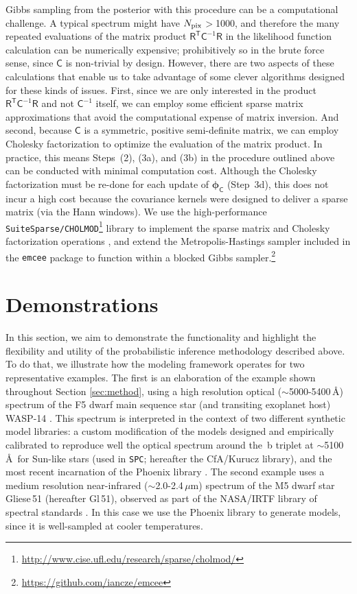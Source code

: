 \documentclass[iop,floatfix]{emulateapj}
\newcommand{\vR}{\mathsf{R}}
\newcommand{\vC}{\mathsf{C}}
\newcommand{\trans}{\mathsf{T}}
\newcommand{\vp}{ {\bm \phi}}
\begin{document}
Gibbs sampling from the posterior with this procedure can be a computational challenge.  A typical 
spectrum might have $N_{\rm pix}$$>$1000, and therefore the many repeated evaluations of the matrix 
product $\vR^{\trans} \vC^{-1} \vR$ in the likelihood function calculation can be numerically 
expensive; prohibitively so in the brute force sense, since $\vC$ is non-trivial by design.  
However, there are two aspects of these calculations that enable us to take advantage of some 
clever algorithms designed for these kinds of issues.  First, since we are only interested in the 
product $\vR^{\trans} \vC^{-1} \vR$ and not $\vC^{-1}$ itself, we can employ some efficient sparse 
matrix approximations that avoid the computational expense of matrix inversion.  And second, 
because $\vC$ is a symmetric, positive semi-definite matrix, we can employ Cholesky factorization
to optimize the evaluation of the matrix product.  In practice, this means Steps~(2), (3a), and 
(3b) in the procedure outlined above can be conducted with minimal computation cost.  Although the
Cholesky factorization must be re-done for each update of $\vp_{\mathsf C}$ (Step~3d), this does 
not incur a high cost because the covariance kernels were designed to deliver a sparse matrix (via 
the Hann windows).  We use the high-performance 
\texttt{SuiteSparse/CHOLMOD}\footnote{\url{http://www.cise.ufl.edu/research/sparse/cholmod/}} 
library to implement the sparse matrix and Cholesky factorization operations \citep{chen08,
davis09}, and extend the Metropolis-Hastings sampler included in the {\tt emcee} package 
\citep{foreman-mackey13} to function within a blocked Gibbs 
sampler.\footnote{\url{https://github.com/iancze/emcee}} \\


\section{Demonstrations} \label{sec:examples}

In this section, we aim to demonstrate the functionality and highlight the flexibility and utility 
of the probabilistic inference methodology described above.  To do that, we illustrate how the 
modeling framework operates for two representative examples.  The first is an elaboration of the 
example shown throughout Section \ref{sec:method}, using a high resolution optical 
($\sim$5000-5400\,\AA) spectrum of the F5 dwarf main sequence star (and transiting exoplanet host) 
WASP-14 \citep{joshi09,torres12}.  This spectrum is interpreted in the context of two different 
synthetic model libraries: a custom modification of the \citet{castelli04} models designed and 
empirically calibrated to reproduce well the optical spectrum around the \,b triplet at 
$\sim$5100\,\AA\ for Sun-like stars (used in {\tt SPC}; hereafter the {\sc CfA/Kurucz} library), 
and the most recent incarnation of the {\sc Phoenix} library \citep{husser13}.  The second 
example uses a medium resolution near-infrared ($\sim$2.0-2.4\,$\mu$m) spectrum of the M5 dwarf 
star Gliese\,51 (hereafter Gl\,51), observed as part of the NASA/IRTF library of spectral standards 
\citep{cushing05,rayner09}.  In this case we use the {\sc Phoenix} library to generate models, 
since it is well-sampled at cooler temperatures.
\end{document}
